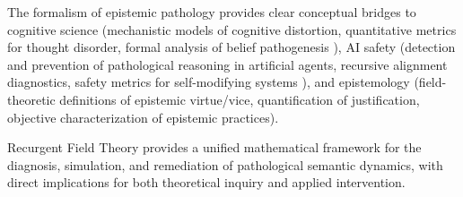 The formalism of epistemic pathology provides clear conceptual bridges to cognitive science (mechanistic models of cognitive distortion, quantitative metrics for thought disorder, formal analysis of belief pathogenesis \autocite{Crick1990, Dehaene2014}), AI safety (detection and prevention of pathological reasoning in artificial agents, recursive alignment diagnostics, safety metrics for self-modifying systems \autocite{RussellDeweyTegmark2016}), and epistemology (field-theoretic definitions of epistemic virtue/vice, quantification of justification, objective characterization of epistemic practices).

Recurgent Field Theory provides a unified mathematical framework for the diagnosis, simulation, and remediation of pathological semantic dynamics, with direct implications for both theoretical inquiry and applied intervention. 
